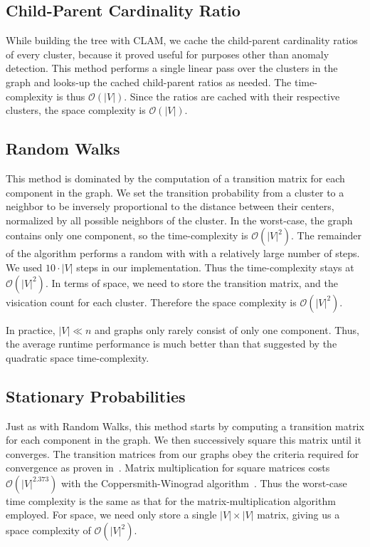 \documentclass{article}
\begin{document}
\subsection{Child-Parent Cardinality Ratio}

While building the tree with CLAM, we cache the child-parent cardinality ratios of every cluster, because it proved useful for purposes other than anomaly detection.
This method performs a single linear pass over the clusters in the graph and looks-up the cached child-parent ratios as needed.
The time-complexity is thus $\mathcal{O}(|V|)$.
Since the ratios are cached with their respective clusters, the space complexity is $\mathcal{O}(|V|)$.

\subsection{Random Walks}

This method is dominated by the computation of a transition matrix for each component in the graph.
We set the transition probability from a cluster to a neighbor to be inversely proportional to the distance between their centers, normalized by all possible neighbors of the cluster.
In the worst-case, the graph contains only one component, so the time-complexity is $\mathcal{O}(|V|^2)$.
The remainder of the algorithm performs a random with with a relatively large number of steps.
We used $10 \cdot |V|$ steps in our implementation.
Thus the time-complexity stays at $\mathcal{O}(|V|^2)$.
In terms of space, we need to store the transition matrix, and the visication count for each cluster.
Therefore the space complexity is $\mathcal{O}(|V|^2)$.

In practice, $|V| \ll n$ and graphs only rarely consist of only one component.
Thus, the average runtime performance is much better than that suggested by the quadratic space time-complexity.

\subsection{Stationary Probabilities}

Just as with Random Walks, this method starts by computing a transition matrix for each component in the graph.
We then successively square this matrix until it converges.
The transition matrices from our graphs obey the criteria required for convergence as proven in~\cite{levin2017markov}.
Matrix multiplication for square matrices costs $\mathcal{O}(|V|^{2.373})$ with the Coppersmith-Winograd algorithm~\cite{coppersmith1987matrix}.
Thus the worst-case time complexity is the same as that for the matrix-multiplication algorithm employed.
For space, we need only store a single $|V| \times |V|$ matrix, giving us a space complexity of $\mathcal{O}(|V|^2)$.
\end{document}
